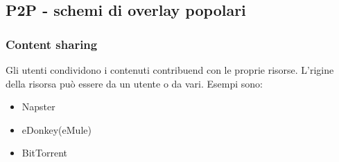 \subsection{P2P - schemi di overlay popolari}
\subsubsection{Content sharing}
Gli utenti condividono i contenuti contribuend con le proprie risorse.
L'rigine della risorsa può essere da un utente o da vari.
Esempi sono:
\begin{itemize}
    \item Napster
    \item eDonkey(eMule)
    \item BitTorrent
\end{itemize}

